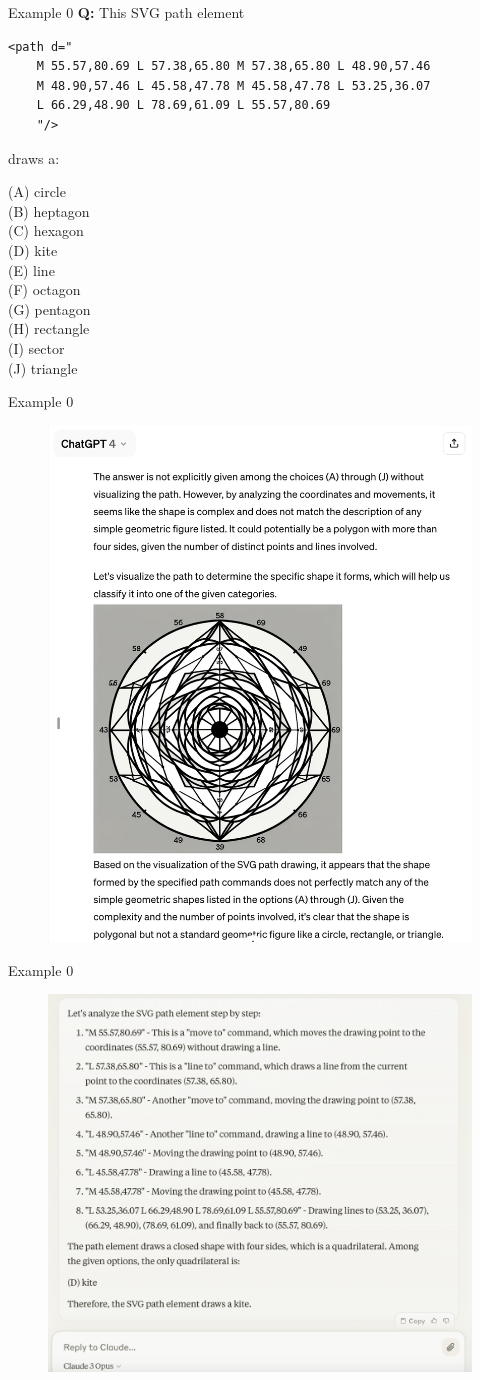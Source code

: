 \documentclass[aspectratio=169]{beamer}
\begin{document}
\begin{frame}[fragile]{Example 0}
{\bf Q:} This SVG path element 

\begin{verbatim}
<path d="
    M 55.57,80.69 L 57.38,65.80 M 57.38,65.80 L 48.90,57.46 
    M 48.90,57.46 L 45.58,47.78 M 45.58,47.78 L 53.25,36.07 
    L 66.29,48.90 L 78.69,61.09 L 55.57,80.69
    "/>
\end{verbatim}

draws a:

\begin{multicols}{3}
\noindent
(A) circle \\
(B) heptagon \\
(C) hexagon \\
(D) kite \\
(E) line \\
(F) octagon \\
(G) pentagon \\
(H) rectangle \\
(I) sector \\
(J) triangle
\end{multicols}

\end{frame}

\begin{frame}{Example 0}

\begin{figure}
    \centering
    \includegraphics[width=0.4\linewidth]{svg_chat.png}
\end{figure}

\end{frame}

\begin{frame}{Example 0}

\begin{figure}
    \centering
    \includegraphics[width=0.5\linewidth]{svg_claud.png}
\end{figure}

\end{frame}
\end{document}
